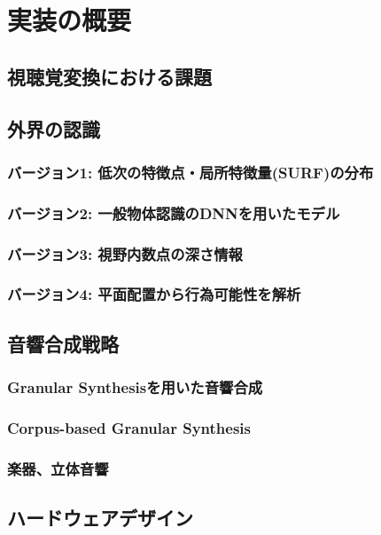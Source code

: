 \section{実装の概要}
\subsection{視聴覚変換における課題}
\subsection{外界の認識}
\subsubsection{バージョン1: 低次の特徴点・局所特徴量(SURF)の分布}
\subsubsection{バージョン2: 一般物体認識のDNNを用いたモデル}
\subsubsection{バージョン3: 視野内数点の深さ情報}
\subsubsection{バージョン4: 平面配置から行為可能性を解析}
\subsection{音響合成戦略}
\subsubsection{Granular Synthesisを用いた音響合成}
\subsubsection{Corpus-based Granular Synthesis}
\subsubsection{楽器、立体音響}
\subsection{ハードウェアデザイン}

